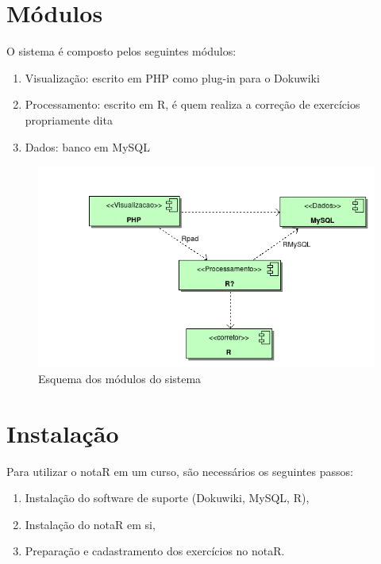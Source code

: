 \documentclass[12pt,a4paper]{article}
\begin{document}
\section{M\'odulos}
O sistema \'e composto pelos seguintes m\'odulos:
\begin{enumerate}
	\item Visualiza\c c\~ao: escrito em PHP como plug-in para o Dokuwiki
	\item Processamento: escrito em R, \'e quem realiza a corre\c c\~ao de
			exerc\'icios propriamente dita
	\item Dados: banco em MySQL
\end{enumerate}

\begin{figure}[htpb]
		\begin{center}
				\includegraphics[scale=0.50]{model/modulos.png}
		\end{center}
		\caption{Esquema dos m\'odulos do sistema}
		\label{fig:modulos}
\end{figure}
\section{Instala\c c\~ao}
Para utilizar o notaR em um curso, s\~ao necess\'arios os seguintes passos:
\begin{enumerate}
	\item Instala\c c\~ao do software de suporte (Dokuwiki, MySQL, R),
	\item Instala\c c\~ao do notaR em si,
	\item Prepara\c c\~ao e cadastramento dos exerc\'icios no notaR.
\end{enumerate}
\end{document}
